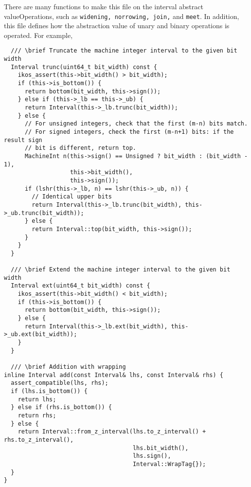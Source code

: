 \documentclass[12pt]{article}
\begin{document}
There are many functions to make this file on the interval abstract valueOperations, such as \texttt{widening, norrowing, join,} and \texttt{meet}. In addition, this file defines how the abstraction value of unary and binary operations is operated. For example,
\begin{lstlisting}
  /// \brief Truncate the machine integer interval to the given bit width
  Interval trunc(uint64_t bit_width) const {
    ikos_assert(this->bit_width() > bit_width);
    if (this->is_bottom()) {
      return bottom(bit_width, this->sign());
    } else if (this->_lb == this->_ub) {
      return Interval(this->_lb.trunc(bit_width));
    } else {
      // For unsigned integers, check that the first (m-n) bits match.
      // For signed integers, check the first (m-n+1) bits: if the result sign
      // bit is different, return top.
      MachineInt n(this->sign() == Unsigned ? bit_width : (bit_width - 1),
                   this->bit_width(),
                   this->sign());
      if (lshr(this->_lb, n) == lshr(this->_ub, n)) {
        // Identical upper bits
        return Interval(this->_lb.trunc(bit_width), this->_ub.trunc(bit_width));
      } else {
        return Interval::top(bit_width, this->sign());
      }
    }
  }

  /// \brief Extend the machine integer interval to the given bit width
  Interval ext(uint64_t bit_width) const {
    ikos_assert(this->bit_width() < bit_width);
    if (this->is_bottom()) {
      return bottom(bit_width, this->sign());
    } else {
      return Interval(this->_lb.ext(bit_width), this->_ub.ext(bit_width));
    }
  }

  /// \brief Addition with wrapping
inline Interval add(const Interval& lhs, const Interval& rhs) {
  assert_compatible(lhs, rhs);
  if (lhs.is_bottom()) {
    return lhs;
  } else if (rhs.is_bottom()) {
    return rhs;
  } else {
    return Interval::from_z_interval(lhs.to_z_interval() + rhs.to_z_interval(),
                                     lhs.bit_width(),
                                     lhs.sign(),
                                     Interval::WrapTag{});
  }
}
\end{lstlisting}
\end{document}
